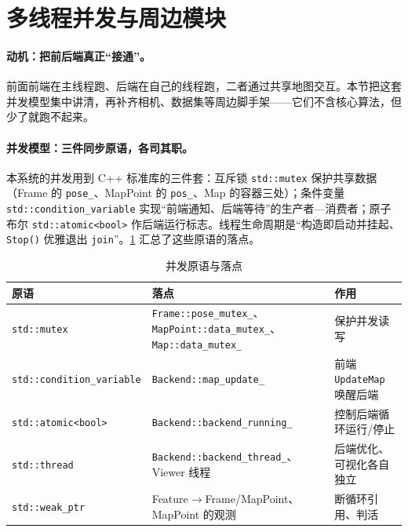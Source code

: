 \section{多线程并发与周边模块}
\label{sec:sys-thread}

\paragraph{动机：把前后端真正“接通”。}
前面前端在主线程跑、后端在自己的线程跑，二者通过共享地图交互。本节把这套并发模型集中讲清，再补齐相机、数据集等周边脚手架——它们不含核心算法，但少了就跑不起来。

\paragraph{并发模型：三件同步原语，各司其职。}
本系统的并发用到 C++ 标准库的三件套：互斥锁 \texttt{std::mutex} 保护共享数据（Frame 的 \texttt{pose\_}、MapPoint 的 \texttt{pos\_}、Map 的容器三处）；条件变量 \texttt{std::condition\_variable} 实现“前端通知、后端等待”的生产者—消费者；原子布尔 \texttt{std::atomic<bool>} 作后端运行标志。线程生命周期是“构造即启动并挂起、\texttt{Stop()} 优雅退出 \texttt{join}”。\cref{tab:sys-concurrency} 汇总了这些原语的落点。

\begin{table}[H]\centering\small
\caption{并发原语与落点}
\label{tab:sys-concurrency}
\begin{tabular}{lll}
\toprule
原语 & 落点 & 作用 \\
\midrule
\texttt{std::mutex} & \texttt{Frame::pose\_mutex\_}、\texttt{MapPoint::data\_mutex\_}、\texttt{Map::data\_mutex\_} & 保护并发读写 \\
\texttt{std::condition\_variable} & \texttt{Backend::map\_update\_} & 前端 \texttt{UpdateMap} 唤醒后端 \\
\texttt{std::atomic<bool>} & \texttt{Backend::backend\_running\_} & 控制后端循环运行/停止 \\
\texttt{std::thread} & \texttt{Backend::backend\_thread\_}、Viewer 线程 & 后端优化、可视化各自独立 \\
\texttt{std::weak\_ptr} & Feature$\to$Frame/MapPoint、MapPoint 的观测 & 断循环引用、判活 \\
\bottomrule
\end{tabular}
\end{table}


